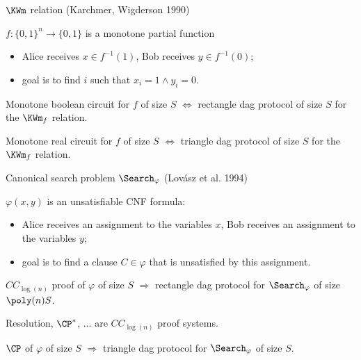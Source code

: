 \begin{frame}{$\KWm$ relation (Karchmer, Wigderson 1990)}

    $f:\{0, 1\}^n \to \{0, 1\}$ is a monotone partial function
    
    \begin{itemize}
        \item Alice receives $x \in f^{-1}(1)$, Bob receives $y \in f^{-1}(0)$;
        \item goal is to find $i$ such that $x_i = 1 \land y_i = 0$.
    \end{itemize}

    \pause

    \begin{theorem}
        Monotone boolean circuit for $f$ of size $S$ $\Leftrightarrow$ rectangle dag protocol of size $S$
        for the $\KWm_f$ relation.
    \end{theorem}

    \pause

    \begin{theorem}
        Monotone real circuit for $f$ of size $S$ $\Leftrightarrow$ triangle dag protocol of size $S$
        for the $\KWm_f$ relation.
    \end{theorem}
\end{frame}


\begin{frame}{Canonical search problem $\Search_{\varphi}$ (Lov{\'{a}}sz et al. 1994)}
    
    $\varphi(x, y)$ is an unsatisfiable CNF formula:
    \begin{itemize}
        \item Alice receives an assignment to the variables $x$, Bob receives an assignment to the
            variables $y$;
        \item goal is to find a clause $C \in \varphi$ that is unsatisfied by this assignment.
    \end{itemize}

    \pause

    \begin{theorem}[Kraj{\'{\i}}{\v{c}}ek 95; S 17]
        $CC_{\log(n)}$ proof of $\varphi$ of size $S$ $\Rightarrow$ rectangle dag protocol for
        $\Search_{\varphi}$ of size $\poly(n) S$.
    \end{theorem}

    Resolution, $\CP^*$, $\dots$ are $CC_{\log(n)}$ proof systems.

    \pause
    
    \begin{theorem}[S 17]
        $\CP$ of $\varphi$ of size $S$ $\Rightarrow$ triangle dag protocol for $\Search_{\varphi}$ of
        size $S$.
    \end{theorem}
\end{frame}